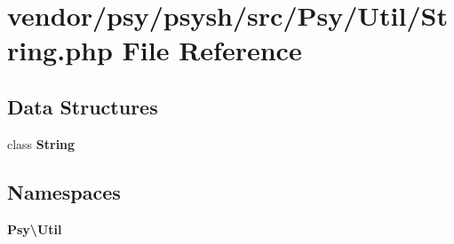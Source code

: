 \section{vendor/psy/psysh/src/\+Psy/\+Util/\+String.php File Reference}
\label{psy_2psysh_2src_2_psy_2_util_2_string_8php}
\subsection*{Data Structures}
\begin{DoxyCompactItemize}
\item 
class {\bf String}
\end{DoxyCompactItemize}
\subsection*{Namespaces}
\begin{DoxyCompactItemize}
\item 
 {\bf Psy\textbackslash{}\+Util}
\end{DoxyCompactItemize}
